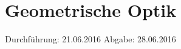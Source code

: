 
\subject{408}
\title{Geometrische Optik}
\date{
  Durchführung: 21.06.2016
  \hspace{3em}
  Abgabe: 28.06.2016
}



\maketitle
\newpage
\mbox{}
\newpage
\thispagestyle{empty}
\tableofcontents
\newpage





\printbibliography


